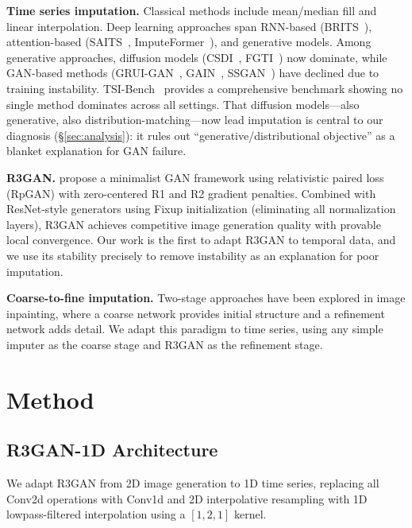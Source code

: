 \documentclass[sigconf,nonacm]{acmart}
\begin{document}
\textbf{Time series imputation.}
Classical methods include mean/median fill and linear interpolation.
Deep learning approaches span RNN-based (BRITS~\citep{cao2018brits}), attention-based (SAITS~\citep{du2023saits}, ImputeFormer~\citep{nie2024imputeformer}), and generative models.
Among generative approaches, diffusion models (CSDI~\citep{tashiro2021csdi}, FGTI~\citep{wang2024fgti}) now dominate, while GAN-based methods (GRUI-GAN~\citep{luo2018grui}, GAIN~\citep{yoon2018gain}, SSGAN~\citep{miao2021ssgan}) have declined due to training instability.
TSI-Bench~\citep{bansal2024tsibench} provides a comprehensive benchmark showing no single method dominates across all settings.
That diffusion models---also generative, also distribution-matching---now lead imputation is central to our diagnosis (\S\ref{sec:analysis}): it rules out ``generative/distributional objective'' as a blanket explanation for GAN failure.

\textbf{R3GAN.}
\citet{huang2024r3gan} propose a minimalist GAN framework using relativistic paired loss (RpGAN) with zero-centered R1 and R2 gradient penalties. Combined with ResNet-style generators using Fixup initialization (eliminating all normalization layers), R3GAN achieves competitive image generation quality with provable local convergence. Our work is the first to adapt R3GAN to temporal data, and we use its stability precisely to remove instability as an explanation for poor imputation.

\textbf{Coarse-to-fine imputation.}
Two-stage approaches have been explored in image inpainting, where a coarse network provides initial structure and a refinement network adds detail. We adapt this paradigm to time series, using any simple imputer as the coarse stage and R3GAN as the refinement stage.

\section{Method}

\subsection{R3GAN-1D Architecture}

We adapt R3GAN from 2D image generation to 1D time series, replacing all Conv2d operations with Conv1d and 2D interpolative resampling with 1D lowpass-filtered interpolation using a $[1,2,1]$ kernel.
\end{document}
